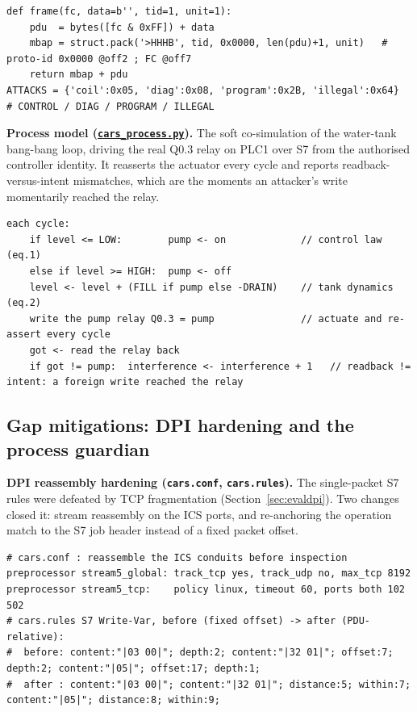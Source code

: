 \begin{lstlisting}[style=carssrc,caption={Crafting an arbitrary Modbus function code (FC at offset 7).},label={lst:mbattack}]
def frame(fc, data=b'', tid=1, unit=1):
    pdu  = bytes([fc & 0xFF]) + data
    mbap = struct.pack('>HHHB', tid, 0x0000, len(pdu)+1, unit)   # proto-id 0x0000 @off2 ; FC @off7
    return mbap + pdu
ATTACKS = {'coil':0x05, 'diag':0x08, 'program':0x2B, 'illegal':0x64}  # CONTROL / DIAG / PROGRAM / ILLEGAL
\end{lstlisting}

\noindent \textbf{Process model (\href{\repourl/blob/main/06_Build/cars_process.py}{\texttt{cars\_process.py}}).} The soft co-simulation of the water-tank bang-bang loop, driving the real Q0.3 relay on PLC1 over S7 from the authorised controller identity. It reasserts the actuator every cycle and reports readback-versus-intent mismatches, which are the moments an attacker's write momentarily reached the relay.

\begin{lstlisting}[style=carspseudo,caption={The bang-bang control law, the dynamics, and the interference health metric, in pseudocode.},label={lst:process}]
each cycle:
    if level <= LOW:        pump <- on             // control law (eq.1)
    else if level >= HIGH:  pump <- off
    level <- level + (FILL if pump else -DRAIN)    // tank dynamics (eq.2)
    write the pump relay Q0.3 = pump               // actuate and re-assert every cycle
    got <- read the relay back
    if got != pump:  interference <- interference + 1   // readback != intent: a foreign write reached the relay
\end{lstlisting}

\subsection*{Gap mitigations: DPI hardening and the process guardian}

\noindent \textbf{DPI reassembly hardening (\texttt{cars.conf}, \texttt{cars.rules}).} The single-packet S7 rules were defeated by TCP fragmentation (Section~\ref{sec:evaldpi}). Two changes closed it: stream reassembly on the ICS ports, and re-anchoring the operation match to the S7 job header instead of a fixed packet offset.

\begin{lstlisting}[style=carssrc,caption={Stream reassembly, and the offset-to-relative rule change.},label={lst:dpihard}]
# cars.conf : reassemble the ICS conduits before inspection
preprocessor stream5_global: track_tcp yes, track_udp no, max_tcp 8192
preprocessor stream5_tcp:    policy linux, timeout 60, ports both 102 502
# cars.rules S7 Write-Var, before (fixed offset) -> after (PDU-relative):
#  before: content:"|03 00|"; depth:2; content:"|32 01|"; offset:7; depth:2; content:"|05|"; offset:17; depth:1;
#  after : content:"|03 00|"; content:"|32 01|"; distance:5; within:7; content:"|05|"; distance:8; within:9;
\end{lstlisting}

